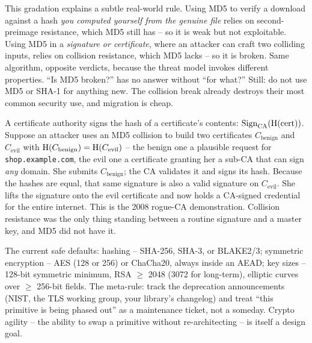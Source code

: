 \begin{trapbox}
This gradation explains a subtle real-world rule. Using MD5 to verify a download against a hash \emph{you computed yourself from the genuine file} relies on second-preimage resistance, which MD5 still has -- so it is weak but not exploitable. Using MD5 in a \emph{signature or certificate}, where an attacker can craft two colliding inputs, relies on collision resistance, which MD5 lacks -- so it is broken. Same algorithm, opposite verdicts, because the threat model invokes different properties. ``Is MD5 broken?'' has no answer without ``for what?'' Still: do not use MD5 or SHA-1 for anything new. The collision break already destroys their most common security use, and migration is cheap.
\end{trapbox}

\begin{example}
\label{ch38:ex-collision-cert}
A certificate authority signs the hash of a certificate's contents: $\operatorname{Sign}_{\text{CA}}(\operatorname{H}(\text{cert}))$. Suppose an attacker uses an MD5 collision to build two certificates $C_{\text{benign}}$ and $C_{\text{evil}}$ with $\operatorname{H}(C_{\text{benign}}) = \operatorname{H}(C_{\text{evil}})$ -- the benign one a plausible request for \texttt{shop.example.com}, the evil one a certificate granting her a sub-CA that can sign \emph{any} domain. She submits $C_{\text{benign}}$; the CA validates it and signs its hash. Because the hashes are equal, that same signature is also a valid signature on $C_{\text{evil}}$. She lifts the signature onto the evil certificate and now holds a CA-signed credential for the entire internet. This is the 2008 rogue-CA demonstration. Collision resistance was the only thing standing between a routine signature and a master key, and MD5 did not have it.
\end{example}

\begin{focusbox}
The current safe defaults: hashing -- SHA-256, SHA-3, or BLAKE2/3; symmetric encryption -- AES (128 or 256) or ChaCha20, always inside an AEAD; key sizes -- 128-bit symmetric minimum, RSA $\ge$ 2048 (3072 for long-term), elliptic curves over $\ge$ 256-bit fields. The meta-rule: track the deprecation announcements (NIST, the TLS working group, your library's changelog) and treat ``this primitive is being phased out'' as a maintenance ticket, not a someday. Crypto agility -- the ability to swap a primitive without re-architecting -- is itself a design goal.
\end{focusbox}

